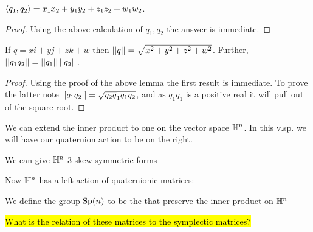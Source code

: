 \documentclass{article}
\begin{document}
\begin{lemma}
	$\left\langle q_1,q_2 \right\rangle = x_1x_2 + y_1y_2 + z_1z_2 + w_1w_2$. 
\end{lemma}
\begin{proof}
	Using the above calculation of $q_1,q_2$ the answer is immediate. 
\end{proof}

\begin{lemma}
If $q = xi + yj + zk + w$ then $\left\lvert\left\lvert q \right\rvert\right\rvert = \sqrt{x^2 + y^2 + z^2 + w^2}$. Further, $\left\lvert\left\lvert q_1 q_2 \right\rvert\right\rvert = \left\lvert\left\lvert q_1 \right\rvert\right\rvert\left\lvert\left\lvert q_2 \right\rvert\right\rvert$. 
\end{lemma}
\begin{proof}
	Using the proof of the above lemma the first result is immediate. To prove the latter note $\left\lvert\left\lvert q_1 q_2 \right\rvert\right\rvert = \sqrt{\overline{q_2} \overline{q}_1 q_1 q_2}$, and as $\bar{q}_1 q_1$ is a positive real it will pull out of the square root. 
\end{proof}

\begin{remark}
	We can extend the inner product to one on the vector space $\mathbb{H}^n$. In this v.sp. we will have our quaternion action to be on the right. 
\end{remark}

\begin{definition}
	We can give $\mathbb{H}^n$ 3 skew-symmetric forms 
\end{definition}

Now $\mathbb{H}^n$ has a left action of quaternionic matrices:

\begin{definition} 
	We define the group $\operatorname{Sp}(n)$ to be the  that preserve the inner product on $\mathbb{H}^n$ 
\end{definition}

\begin{remark}
	\hl{What is the relation of these matrices to the symplectic matrices?}
\end{remark}
\end{document}
